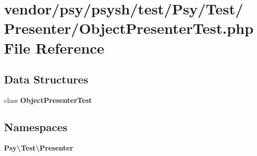 \section{vendor/psy/psysh/test/\+Psy/\+Test/\+Presenter/\+Object\+Presenter\+Test.php File Reference}
\label{_object_presenter_test_8php}
\subsection*{Data Structures}
\begin{DoxyCompactItemize}
\item 
class {\bf Object\+Presenter\+Test}
\end{DoxyCompactItemize}
\subsection*{Namespaces}
\begin{DoxyCompactItemize}
\item 
 {\bf Psy\textbackslash{}\+Test\textbackslash{}\+Presenter}
\end{DoxyCompactItemize}
